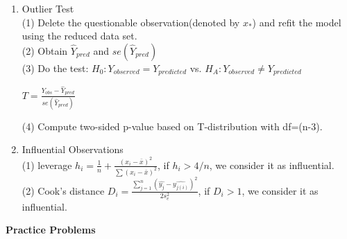 \documentclass[11pt]{article}
\begin{document}
\begin{enumerate}
\begin{enumerate}
\item Outlier Test\\
(1) Delete the questionable observation(denoted by $x_*$) and refit the model using the reduced data set.\\
(2) Obtain $\hat{Y}_{pred}$ and $se(\hat{Y}_{pred})$\\
(3) Do the test: $H_0: Y_{observed}=Y_{predicted}$ vs. $H_A: Y_{observed}\neq Y_{predicted}$\\
\begin{center}
$T=\frac{Y_{obs}-\hat{Y}_{pred}}{se(\hat{Y}_{pred})}$
\end{center}
(4) Compute two-sided p-value based on T-distribution with df=(n-3).

\item Influential Observations\\
(1) leverage $h_i=\frac{1}{n}+\frac{(x_i-\bar{x})^2}{\sum(x_i-\bar{x})^2}$, if $h_i > 4/n$, we consider it as influential.\\
(2) Cook's distance $D_i=\frac{\sum_{j=1}^n (\hat{y_j}-\hat{y_{j(i)}})^2}{2s_e^2}$, if $D_i >1$, we consider it as influential.
\end{enumerate}


\end{enumerate}

\newpage
\begin{flushleft}
{\Large\bf Practice Problems}
\end{flushleft}
\end{document}
